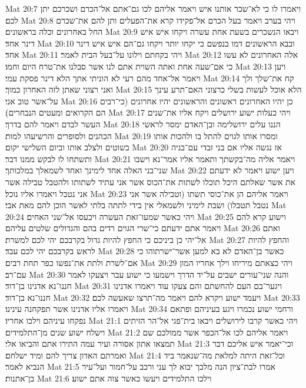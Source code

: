 Mat 20:7  ויאמרו לו כי לא־שכר אותנו איש ויאמר אליהם לכו גם־אתם אל־הכרם ושכרכם יתן לכם׃
Mat 20:8  ויהי בערב ויאמר בעל הכרם אל־פקידו קרא את־הפעלים ותן להם את־שכרם החל באחרונים וכלה בראשונים׃
Mat 20:9  ויבאו הנשכרים בשעת אחת עשרה ויקחו איש איש דינר אחד׃
Mat 20:10  ובבא הראשונים דמו בנפשם כי יקחו יותר ויקחו גם־הם איש איש דינר אחד׃
Mat 20:11  ויהי בקחתם וילונו על־בעל הבית לאמר׃
Mat 20:12  אלה האחרונים לא עשו כי אם־שעה אחת ואתה השוית אתם לנו אשר סבלנו את־טרח היום וחמו׃
Mat 20:13  ויען ויאמר אל־אחד מהם רעי לא הוניתי אתך הלא דינר פסקת עמי׃
Mat 20:14  קח את־שלך ולך ואני רצוני שאתן לזה האחרון כמוך׃
Mat 20:15  הלא אוכל לעשות בשלי כרצוני האם־תרע עינך על־אשר טוב אני׃
Mat 20:16  כן יהיו האחרונים ראשונים והראשונים יהיו אחרונים (כי־רבים הם הקרואים ומעטים הנבחרים)׃
Mat 20:17  ויהי כעלות ישוע ירושלים ויקח אליו את־שנים העשר לבדם ויאמר להם בדרך׃
Mat 20:18  הננו עלים ירושלימה ובן־האדם ימסר לראשי הכהנים ולסופרים והרשיעהו למות׃
Mat 20:19  ומסרו אותו לגוים להתל בו ולהכות אותו בשוטים ולצלב אותו וביום השלישי יקום׃
Mat 20:20  אז נגשה אליו אם בני זבדי עם־בניה ותשתחו לו לבקש ממנו דבר׃
Mat 20:21  ויאמר אליה מה־בקשתך ותאמר אליו אמר־נא וישבו שני־בני האלה אחד לימינך ואחד לשמאלך במלכותך׃
Mat 20:22  ויען ישוע ויאמר לא ידעתם את אשר שאלתם היכל תוכלו לשתות את־הכוס אשר אני עתיד לשתותו ולהטבל טבילה אשר אני נטבל ויאמרו אליו נוכל׃
Mat 20:23  ויאמר אליהם הן את־כוסי תשתו (וטבילה אשר אני נטבל תטבלו) ושבת לימיני ולשמאלי אין בידי לתתה בלתי לאשר הוכן להם מאת אבי׃
Mat 20:24  ויהי כאשר שמעו־זאת העשרה ויכעסו אל־שני האחים׃
Mat 20:25  וישוע קרא להם ויאמר אתם ידעתם כי־שרי הגוים רדים בהם והגדולים שלטים עליהם׃
Mat 20:26  ואתם אל־יהי כן ביניכם כי החפץ להיות גדול בקרבכם יהי לכם למשרת׃
Mat 20:27  והחפץ להיות לראש בקרבכם יהי לכם עבד׃
Mat 20:28  כאשר בן־האדם לא בא למען אשר־ישרתוהו כי אם־לשרת ולתת את־נפשו כפר תחת רבים׃
Mat 20:29  ויהי כצאתם מיריחו וילך אחריו המון עם־רב׃
Mat 20:30  והנה שני־עורים ישבים על־יד הדרך וישמעו כי ישוע עבר ויצעקו לאמר חננו־נא אדנינו בן־דוד׃
Mat 20:31  ויגער־בם העם להחשתם והם צעקו עוד ויאמרו אדנינו חננו־נא בן־דוד׃
Mat 20:32  ויעמד ישוע ויקרא להם ויאמר מה־תרצו שאעשה לכם׃
Mat 20:33  ויאמרו אליו אדנינו אשר תפקחנה עינינו׃
Mat 20:34  ורחמי ישוע נכמרו ויגע בעיניהם ופתאם נפקחו עיניהם וילכו אחריו׃
Mat 21:1  ויהי כאשר קרבו לירושלים ויבאו בית־פגי אל־הר הזיתים וישלח ישוע שנים מן־התלמידים׃
Mat 21:2  ויאמר אליהם לכו אל־הכפר אשר ממולכם שם תמצאו אתון אסורה ועיר עמה התירו אתם והביאו אלי׃
Mat 21:3  וכי־יאמר איש אליכם דבר ואמרתם האדון צריך להם ומיד ישלחם׃
Mat 21:4  וכל־זאת היתה למלאת מה־שנאמר ביד הנביא לאמר׃
Mat 21:5  אמרו לבת־ציון הנה מלכך יבוא לך עני ורכב על־חמור ועל־עיר בן־אתנות׃
Mat 21:6  וילכו התלמידים ויעשו כאשר צוה אתם ישוע׃
